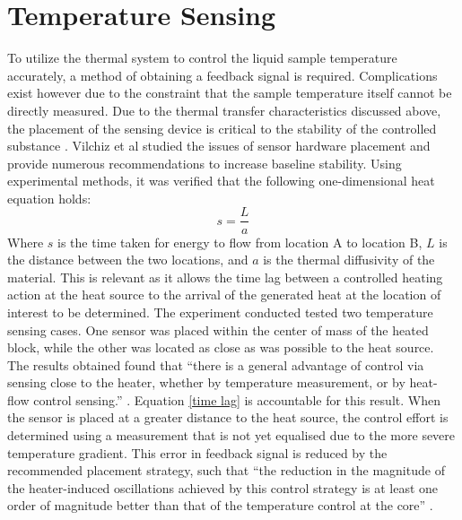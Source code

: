 \section{Temperature Sensing}
To utilize the thermal system to control the liquid sample temperature accurately, a method of obtaining a feedback signal is required. Complications exist however due to the constraint that the sample temperature itself cannot be directly measured. Due to the thermal transfer characteristics discussed above, the placement of the sensing device is critical to the stability of the controlled substance \cite{20130415930883}. Vilchiz et al studied the issues of sensor hardware placement and provide numerous recommendations to increase baseline stability. Using experimental methods, it was verified that the following one-dimensional heat equation holds:
\begin{equation}\label{time lag}
s=\frac{L}{a}
\end{equation}
Where $s$ is the time taken for energy to flow from location A to location B, $L$ is the distance between the two locations, and $a$ is the thermal diffusivity of the material. This is relevant as it allows the time lag between a controlled heating action at the heat source to the arrival of the generated heat at the location of interest to be determined. The experiment conducted tested two temperature sensing cases. One sensor was placed within the center of mass of the heated block, while the other was located as close as was possible to the heat source. The results obtained found that ``there is a general advantage of control via sensing close to the heater, whether by temperature measurement, or by heat-flow control sensing.'' \cite{20130415930883}. Equation \ref{time lag} is accountable for this result. When the sensor is placed at a greater distance to the heat source, the control effort is determined using a measurement that is not yet equalised due to the more severe temperature gradient. This error in feedback signal is reduced by the recommended placement strategy, such that ``the reduction in the magnitude of the heater-induced oscillations achieved by this control strategy is at least one order of magnitude better than that of the temperature control at the core'' \cite{20130415930883}.\\


